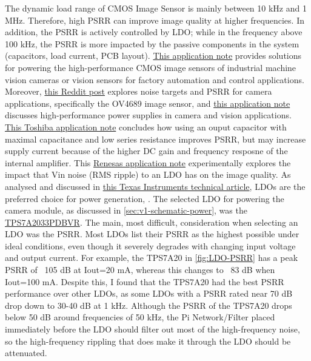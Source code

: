 The dynamic load range of CMOS Image Sensor is mainly between 10 kHz and 1 MHz. Therefore, high PSRR can improve image quality at higher frequencies. In addition, the PSRR is actively controlled by LDO; while in the frequency above 100 kHz, the PSRR is more impacted by the passive components in the system (capacitors, load current, PCB layout). \href{https://way-on.com/en_technical/show-25981.html}{This application note}  provides solutions for powering the high-performance CMOS image sensors of industrial machine vision cameras or vision sensors for factory automation and control applications. Moreover, \href{https://www.reddit.com/r/AskElectronics/comments/l1x9iw/image_sensor_power_supply_choice/}{this Reddit post} explores noise targets and PSRR for camera applications, specifically the OV4689 image sensor, and \href{https://docs.ampnuts.ru/ti.com.datasheet/LM3880/Application_note_SBVA059A.PDF}{this application note} discusses high-performance power supplies in camera and vision applications. \href{https://toshiba.semicon-storage.com/info/TCR5BM10_application_note_en_20210326_AKX00309.pdf?did=67686&prodName=TCR5BM10}{This Toshiba application note} concludes how using an ouput capacitor with maximal capacitance and low series resistance improves PSRR, but may increase supply current because of the higher DC gain and frequency resposne of the internal amplifier. This \href{https://www.renesas.com/en/document/apn/cm-400-noise-component-role-forming-image-quality}{Renesas application note} experimentally explores the impact that Vin noise (RMS ripple) to an LDO has on the image quality. As analysed and discussed in \href{https://www.ti.com/lit/ta/ssztb42/ssztb42.pdf?ts=1775541051914&ref_url=https%253A%252F%252Fwww.google.com%252F}{this Texas Instruments technical article}, LDOs are the preferred choice for power generation, .
\nl
The selected LDO for powering the camera module, as discussed in \autoref{sec:v1-schematic-power}, was the \href{https://au.mouser.com/ProductDetail/Texas-Instruments/TPS7A2033PDBVR?qs=hd1VzrDQEGjk%2FOBnRfKB4A%3D%3D}{TPS7A2033PDBVR}. The main, most difficult, consideration when selecting an LDO was the PSRR. Most LDOs list their PSRR as the highest possible under ideal conditions, even though it severely degrades with changing input voltage and output current. For example, the TPS7A20 in \autoref{fig:LDO-PSRR} has a peak PSRR of ~105 dB at Iout=20 mA, whereas this changes to ~83 dB when Iout=100 mA. Despite this, I found that the TPS7A20 had the best PSRR performance over other LDOs, as some LDOs with a PSRR rated near 70 dB drop down to 30-40 dB at 1 kHz. Although the PSRR of the TPS7A20 drops below 50 dB around frequencies of 50 kHz, the Pi Network/Filter placed immediately before the LDO should filter out most of the high-frequency noise, so the high-frequency rippling that does make it through the LDO should be attenuated.
